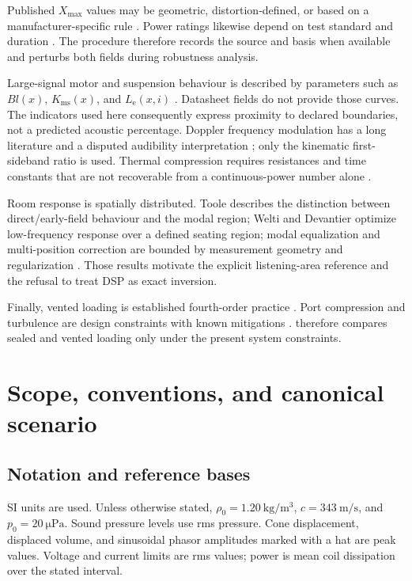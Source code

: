 \documentclass[11pt,a4paper]{article}
\numberwithin{equation}{section}
\newcommand{\Xmax}{X_{\mathrm{max}}}
\begin{document}
Published $\Xmax$ values may be geometric, distortion-defined, or based on a
manufacturer-specific rule \cite{iec62458,klippel2003xmax,klippel2006}.
Power ratings likewise depend on test standard and duration \cite{aes2}.
The procedure therefore records the source and basis when available and
perturbs both fields during robustness analysis.

Large-signal motor and suspension behaviour is described by parameters such
as $Bl(x)$, $K_{\mathrm{ms}}(x)$, and $L_{\mathrm e}(x,i)$
\cite{klippel2006}.  Datasheet fields do not provide those curves.  The
indicators used here consequently express proximity to declared boundaries,
not a predicted acoustic percentage.  Doppler frequency modulation has a
long literature and a disputed audibility interpretation
\cite{klipsch1969,allison1982}; only the kinematic first-sideband ratio is
used.  Thermal compression requires resistances and time constants that are
not recoverable from a continuous-power number alone \cite{button1992}.

Room response is spatially distributed.  Toole \cite{toole2006} describes
the distinction between direct/early-field behaviour and the modal region;
Welti and Devantier \cite{welti2006} optimize low-frequency response over a
defined seating region; modal equalization and multi-position correction are
bounded by measurement geometry and regularization
\cite{makivirta2003,cecchi2018}.  Those results motivate the explicit
listening-area reference and the refusal to treat DSP as exact inversion.

Finally, vented loading is established fourth-order practice
\cite{small1973vented}.  Port compression and turbulence are design
constraints with known mitigations \cite{salvatti2002,vanderkooy1998}.
 therefore compares sealed and vented loading only under
the present system constraints.

\section{Scope, conventions, and canonical scenario}
\label{sec:scope}

\subsection{Notation and reference bases}
\label{sec:scope-bases}

SI units are used.  Unless otherwise stated,
$\rho_0=\SI{1.20}{\kilogram\per\cubic\meter}$,
$c=\SI{343}{\meter\per\second}$, and $p_0=\SI{20}{\micro\pascal}$.
Sound pressure levels use rms pressure.  Cone displacement, displaced
volume, and sinusoidal phasor amplitudes marked with a hat are peak values.
Voltage and current limits are rms values; power is mean coil dissipation
over the stated interval.
\end{document}

